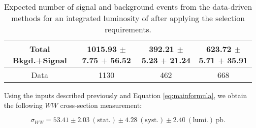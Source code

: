 \begin{table}[ht!]
\begin{center}
\begin{tabular} {|c|c|c|c|}
Total Bkgd.+Signal    & 1015.93 $\pm$ 7.75 $\pm$ 56.52   & 392.21 $\pm$ 5.23 $\pm$ 21.24   & 623.72 $\pm$ 5.71 $\pm$ 35.91 \\ \hline \hline
Data                  & 1130                             & 462                             & 668 \\ \hline
\end{tabular}
  \caption{Expected number of signal and background events from the data-driven methods for
  an integrated luminosity of \intlumi after applying the selection requirements.}
   \label{tab:data_yields}
  \end{center}
\end{table}

Using the inputs described previously and Equation \ref{eq:mainformula},
we obtain the following $WW$ cross-section measurement:

\begin{equation*}
\sigma_{WW}  = 53.41 \pm 2.03~\mathrm{(stat.)} \pm 4.28~\mathrm{(syst.)} \pm 2.40~\mathrm{(lumi.)~pb}.
\end{equation*}


